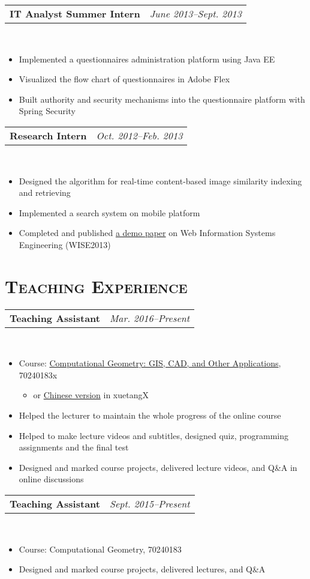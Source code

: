 \documentclass[11pt,a4paper,roman]{moderncv}        %
\makeatletter
\newcommand{\cvexpr}[5][1em]{
  \begin{tabular*}{\maincolumnwidth}{l@{\extracolsep{\fill}}r}%
    {\textbf{#3}\ifthenelse{\equal{#4}{}}{}{, #4}} & {\small\itshape#2}%
  \end{tabular*}%
  \\
  \begin{minipage}{\maincolumnwidth}%
        #5%
  \end{minipage}%
  \par\addvspace{#1}
}
\makeatother
\begin{document}
\cvexpr{June 2013--Sept. 2013}{IT Analyst Summer Intern}{Morgan Stanley}{
\begin{itemize}
\item Implemented a questionnaires administration platform using Java EE
\item Visualized the flow chart of questionnaires in Adobe Flex
\item Built authority and security mechanisms into the questionnaire platform with Spring Security
\end{itemize}
}

\cvexpr{Oct. 2012--Feb. 2013}{Research Intern}{School of ITEE, University of Queensland}{
\begin{itemize}
\item Designed the algorithm for real-time content-based image similarity indexing and retrieving
\item Implemented a search system on mobile platform
\item Completed and published \href{http://link.springer.com/chapter/10.1007\%2F978-3-642-41154-0_47}{a demo paper} on Web Information Systems Engineering (WISE2013)
\end{itemize}
}

\section{\scshape Teaching Experience}
\cvexpr{Mar. 2016--Present}{Teaching Assistant}{TsinghuaX, edX}{
\begin{itemize}
\item Course: \href{https://www.edx.org/course/computational-geometry-gis-cad-other-tsinghuax-70240183x-0}{Computational Geometry: GIS, CAD, and Other Applications}, 70240183x\begin{itemize}
\item or \href{http://www.xuetangx.com/courses/course-v1:TsinghuaX+70240183x+2016_2/about}{Chinese version} in xuetangX
\end{itemize}
\item Helped the lecturer to maintain the whole progress of the online course
\item Helped to make lecture videos and subtitles, designed quiz, programming assignments and the final test
\item Designed and marked course projects, delivered lecture videos, and Q\&A in online discussions
\end{itemize}
}

\cvexpr{Sept. 2015--Present}{Teaching Assistant}{Tsinghua University}{
\begin{itemize}
\item Course: Computational Geometry, 70240183
\item Designed and marked course projects, delivered lectures, and Q\&A
\end{itemize}
}
\end{document}
